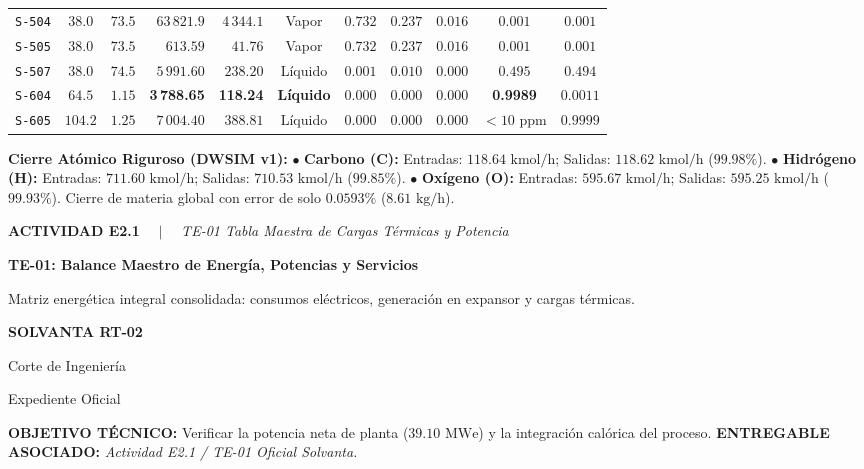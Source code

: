 \documentclass[10pt,landscape]{article}
\newcommand{\slideheader}[4]{%
  \noindent
  \begin{minipage}[c]{0.78\textwidth}
    {\fontsize{7pt}{8.5pt}\selectfont \textbf{\color{accentcyan}#1} \ \ $|$ \ \ \textit{\color{black!70}#2}}\par
    \vspace{1.5pt}
    {\fontsize{12pt}{14pt}\selectfont \textbf{\color{navyblue}#3}}\par
    \vspace{1.5pt}
    {\fontsize{7.2pt}{8.8pt}\selectfont \color{black!80}#4}
  \end{minipage}
  \hfill
  \begin{minipage}[c]{0.20\textwidth}
    \begin{tcolorbox}[colback=navyblue,colframe=navyblue,arc=1.5mm,boxrule=0pt,top=2.5pt,bottom=2.5pt,left=4pt,right=4pt]
      \centering
      {\color{white}\fontsize{7.5pt}{9pt}\selectfont \textbf{SOLVANTA RT-02}}\par
      \vspace{1pt}
      {\color{accentcyan}\fontsize{6pt}{7.5pt}\selectfont Corte de Ingeniería}\par
      {\color{white!80}\fontsize{5.5pt}{7pt}\selectfont Expediente Oficial}
    \end{tcolorbox}
  \end{minipage}
  \par\vspace{2pt}
  \noindent{\color{navyblue}\rule{\textwidth}{1.0pt}}
  \par\vspace{2pt}
}
\newenvironment{objectivebox}[2]{%
  \begin{tcolorbox}[
    colback=softblue,
    colframe=accentcyan,
    arc=1.5mm,
    boxrule=0.7pt,
    top=2pt,
    bottom=2pt,
    left=6pt,
    right=6pt
  ]
    \noindent
    \textbf{\fontsize{6.5pt}{7.8pt}\selectfont \color{navyblue}OBJETIVO TÉCNICO:} 
    {\fontsize{6.5pt}{7.8pt}\selectfont #1}
    \hfill
    \textbf{\fontsize{6.5pt}{7.8pt}\selectfont \color{navyblue}ENTREGABLE ASOCIADO:} 
    {\fontsize{6.5pt}{7.8pt}\selectfont \textit{#2}}
  \end{tcolorbox}
  \vspace{1.5pt}
}{}
\begin{document}
\begin{tabularx}{\textwidth}{l c c r r c c c c c c}
  \rowcolor{rowodd}
  \texttt{S-504} & $38.0$ & $73.5$ & $63\,821.9$ & $4\,344.1$ & Vapor & $0.732$ & $0.237$ & $0.016$ & $0.001$ & $0.001$ \\
  \rowcolor{roweven}
  \texttt{S-505} & $38.0$ & $73.5$ & $613.59$ & $41.76$ & Vapor & $0.732$ & $0.237$ & $0.016$ & $0.001$ & $0.001$ \\
  \rowcolor{rowodd}
  \texttt{S-507} & $38.0$ & $74.5$ & $5\,991.60$ & $238.20$ & Líquido & $0.001$ & $0.010$ & $0.000$ & $0.495$ & $0.494$ \\
  \rowcolor{badgegreen}
  \texttt{S-604} & $64.5$ & $1.15$ & \textbf{3\,788.65} & \textbf{118.24} & \textbf{Líquido} & $0.000$ & $0.000$ & $0.000$ & \textbf{0.9989} & $0.0011$ \\
  \rowcolor{roweven}
  \texttt{S-605} & $104.2$ & $1.25$ & $7\,004.40$ & $388.81$ & Líquido & $0.000$ & $0.000$ & $0.000$ & $<10\text{ ppm}$ & $0.9999$ \\
  \bottomrule
\end{tabularx}

\vspace{2pt}
\begin{tcolorbox}[colback=white,colframe=navyblue!40,arc=1.5mm,boxrule=0.6pt,top=2pt,bottom=2pt,left=6pt,right=6pt]
  \scriptsize
  \textbf{\color{navyblue}Cierre Atómico Riguroso (DWSIM v1):} 
  $\bullet$ \textbf{Carbono (C):} Entradas: $118.64\text{ kmol/h}$; Salidas: $118.62\text{ kmol/h}$ ($\mathbf{99.98\%}$). \newline
  $\bullet$ \textbf{Hidrógeno (H):} Entradas: $711.60\text{ kmol/h}$; Salidas: $710.53\text{ kmol/h}$ ($\mathbf{99.85\%}$). \newline
  $\bullet$ \textbf{Oxígeno (O):} Entradas: $595.67\text{ kmol/h}$; Salidas: $595.25\text{ kmol/h}$ ($\mathbf{99.93\%}$). Cierre de materia global con error de solo $\mathbf{0.0593\%}$ ($8.61\text{ kg/h}$).
\end{tcolorbox}

\newpage

\slideheader{ACTIVIDAD E2.1}{TE-01 Tabla Maestra de Cargas Térmicas y Potencia}{TE-01: Balance Maestro de Energía, Potencias y Servicios}{Matriz energética integral consolidada: consumos eléctricos, generación en expansor y cargas térmicas.}

\begin{objectivebox}{Verificar la potencia neta de planta ($39.10\text{ MWe}$) y la integración calórica del proceso.}{Actividad E2.1 / TE-01 Oficial Solvanta.}
\end{objectivebox}
\end{document}
